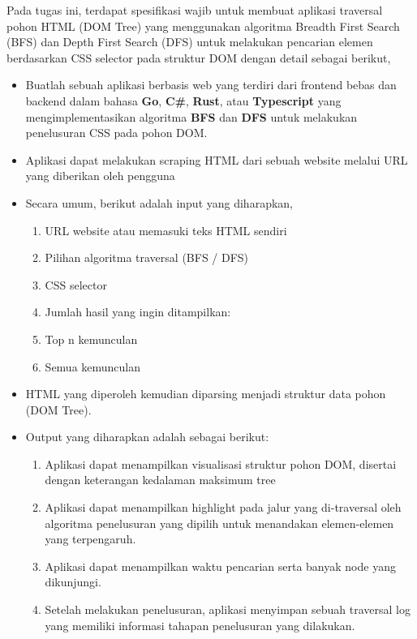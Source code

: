 \documentclass[12pt,a4paper]{article}
\begin{document}
Pada tugas ini, terdapat spesifikasi wajib untuk membuat aplikasi traversal pohon HTML (DOM Tree) yang menggunakan algoritma Breadth First Search (BFS) dan Depth First Search (DFS) untuk melakukan pencarian elemen berdasarkan CSS selector pada struktur DOM dengan detail sebagai berikut,
\begin{itemize}
    \item Buatlah sebuah aplikasi berbasis web yang terdiri dari frontend bebas dan backend dalam bahasa \textbf{Go}, \textbf{C\#}, \textbf{Rust}, atau \textbf{Typescript} yang mengimplementasikan algoritma \textbf{BFS} dan \textbf{DFS} untuk melakukan penelusuran CSS pada pohon DOM.
    \item Aplikasi dapat melakukan scraping HTML dari sebuah website melalui URL yang diberikan oleh pengguna
    \item Secara umum, berikut adalah input yang diharapkan,
    \begin{enumerate}
        \item URL website atau memasuki teks HTML sendiri
        \item Pilihan algoritma traversal (BFS / DFS)
        \item CSS selector
        \item Jumlah hasil yang ingin ditampilkan:
        \item Top n kemunculan
        \item Semua kemunculan
    \end{enumerate}
    \item HTML yang diperoleh kemudian diparsing menjadi struktur data pohon (DOM Tree).
    \item Output yang diharapkan adalah sebagai berikut:
    \begin{enumerate}
        \item Aplikasi dapat menampilkan visualisasi struktur pohon DOM, disertai dengan keterangan kedalaman maksimum tree
        \item Aplikasi dapat menampilkan highlight pada jalur yang di-traversal oleh algoritma penelusuran yang dipilih untuk menandakan elemen-elemen yang terpengaruh.
        \item Aplikasi dapat menampilkan waktu pencarian serta banyak node yang dikunjungi. 
        \item Setelah melakukan penelusuran, aplikasi menyimpan sebuah traversal log yang memiliki informasi tahapan penelusuran yang dilakukan. 
    \end{enumerate}
\end{itemize} \\
\end{document}
